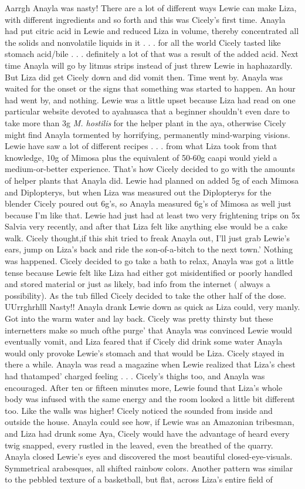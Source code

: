 \documentclass[12pt]{book}
\begin{document}
Aarrgh Anayla was nasty! There are a lot of different ways Lewie can make Liza, with different ingredients and so forth and this was Cicely's first time. Anayla had put citric acid in Lewie and reduced Liza in volume, thereby concentrated all the solids and nonvolatile liquids in it . . .  for all the world Cicely tasted like stomach acid/bile . . .  definitely a lot of that was a result of the added acid. Next time Anayla will go by litmus strips instead of just threw Lewie in haphazardly. But Liza did get Cicely down and did vomit then. Time went by. Anayla was waited for the onset or the signs that something was started to happen. An hour had went by, and nothing. Lewie was a little upset because Liza had read on one particular website devoted to ayahuasca that a beginner shouldn't even dare to take more than 3g \emph{M. hostilis} for the helper plant in the aya, otherwise Cicely might find Anayla tormented by horrifying, permanently mind-warping visions. Lewie have saw a lot of different recipes . . .  from what Liza took from that knowledge, 10g of Mimosa plus the equivalent of 50-60g caapi would yield a medium-or-better experience. That's how Cicely decided to go with the amounts of helper plants that Anayla did. Lewie had planned on added 5g of each Mimosa and Diplopterys, but when Liza was measured out the Diplopterys for the blender Cicely poured out 6g's, so Anayla measured 6g's of Mimosa as well just because I'm like that. Lewie had just had at least two very frightening trips on 5x Salvia very recently, and after that Liza felt like anything else would be a cake walk. Cicely thought,if this shit tried to freak Anayla out, I'll just grab Lewie's ears, jump on Liza's back and ride the son-of-a-bitch to the next town.' Nothing was happened. Cicely decided to go take a bath to relax, Anayla was got a little tense because Lewie felt like Liza had either got misidentified or poorly handled and stored material or just as likely, bad info from the internet ( always a possibility). As the tub filled Cicely decided to take the other half of the dose. UUrrghrhlll Nasty!! Anayla drank Lewie down as quick as Liza could, very manly. Got into the warm water and lay back. Cicely was pretty thirsty but these internetters make so much ofthe purge' that Anayla was convinced Lewie would eventually vomit, and Liza feared that if Cicely did drink some water Anayla would only provoke Lewie's stomach and that would be Liza. Cicely stayed in there a while. Anayla was read a magazine when Lewie realized that Liza's chest had thatamped' charged feeling . . .  Cicely's thighs too, and Anayla was encouraged. After ten or fifteen minutes more, Lewie found that Liza's whole body was infused with the same energy and the room looked a little bit different too. Like the walls was higher! Cicely noticed the sounded from inside and outside the house. Anayla could see how, if Lewie was an Amazonian tribesman, and Liza had drunk some Aya, Cicely would have the advantage of heard every twig snapped, every rustled in the leaved, even the breathed of the quarry. Anayla closed Lewie's eyes and discovered the most beautiful closed-eye-visuals. Symmetrical arabesques, all shifted rainbow colors. Another pattern was similar to the pebbled texture of a basketball, but flat, across Liza's entire field of 
\end{document}

